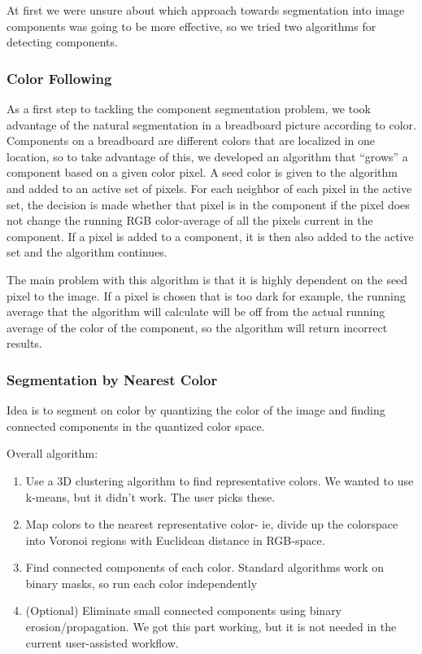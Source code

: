 \documentclass[10pt,twocolumn,letterpaper]{article}
\begin{document}
At first we were unsure about which approach towards segmentation into image
components was going to be more effective, so we tried two algorithms for
detecting components. 

\subsubsection{Color Following}

As a first step to tackling the component segmentation problem, we took
advantage of the natural segmentation in a breadboard picture according to
color. Components on a breadboard are different colors that are localized in
one location, so to take advantage of this, we developed an algorithm that
``grows'' a component based on a given color pixel. A seed color is given to
the algorithm and added to an active set of pixels. For each neighbor of each
pixel in the active set, the decision is made whether that pixel is in the
component if the pixel does not change the running RGB color-average of all the
pixels current in the component. If a pixel is added to a component, it is then
also added to the active set and the algorithm continues.     

The main problem with this algorithm is that it is highly dependent on the seed
pixel to the image. If a pixel is chosen that is too dark for example, the
running average that the algorithm will calculate will be off from the actual
running average of the color of the component, so the algorithm will return
incorrect results.   

\subsubsection{Segmentation by Nearest Color}

Idea is to segment on color by quantizing the color of the
image and finding connected components in the quantized color space.

Overall algorithm:
\begin{enumerate}
\item Use a 3D clustering algorithm to find representative colors. We
  wanted to use k-means, but it didn't work. The user picks these.
\item Map colors to the nearest representative color- ie, divide up
  the colorspace into Voronoi regions with Euclidean distance in
  RGB-space.
\item Find connected components of each color. Standard algorithms
  work on binary masks, so run each color independently
\item (Optional) Eliminate small connected components using binary
  erosion/propagation. We got this part working, but it is not needed
  in the current user-assisted workflow.
\end{enumerate}
\end{document}
